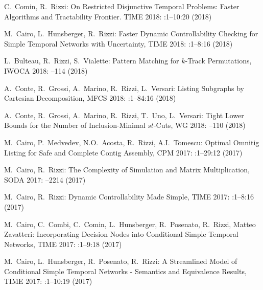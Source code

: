 
\begin{etaremune}

  \item {\sc C.~Comin, R.~Rizzi:}
   \newblock On Restricted Disjunctive Temporal Problems: Faster Algorithms and Tractability Frontier.
   \newblock TIME 2018:
   :1--10:20 (2018)
  
  \item {\sc M.~Cairo, L.~Hunsberger, R.~Rizzi:}
   \newblock Faster Dynamic Controllability Checking for Simple Temporal Networks with Uncertainty,
   \newblock TIME 2018:
   :1--8:16 (2018)
   
  \item {\sc L.~Bulteau, R.~Rizzi, S.~Vialette:}
   \newblock Pattern Matching for $k$-Track Permutations,
   \newblock IWOCA 2018:
   --114 (2018)

  \item {\sc A.~Conte, R.~Grossi, A.~Marino, R.~Rizzi, L.~Versari:}
   \newblock Listing Subgraphs by Cartesian Decomposition,
   \newblock MFCS 2018:
   :1--84:16 (2018)

  \item {\sc A.~Conte, R.~Grossi, A.~Marino, R.~Rizzi, T.~Uno, L.~Versari:}
   \newblock Tight Lower Bounds for the Number of Inclusion-Minimal $st$-Cuts,
   \newblock WG 2018:
   --110 (2018)
   
  \item {\sc M.~Cairo, P.~Medvedev, N.O.~Acosta, R.~Rizzi, A.I.~Tomescu:}
   \newblock Optimal Omnitig Listing for Safe and Complete Contig Assembly,
   \newblock CPM 2017:
   :1--29:12 (2017)

  \item {\sc M.~Cairo, R.~Rizzi:}
   \newblock The Complexity of Simulation and Matrix Multiplication,
   \newblock SODA 2017:
   --2214 (2017)

  \item {\sc M.~Cairo, R.~Rizzi:}
   \newblock Dynamic Controllability Made Simple,
   \newblock TIME 2017:
   :1--8:16 (2017)

  \item {\sc M.~Cairo, C.~Combi, C.~Comin, L.~Hunsberger, R.~Posenato, R.~Rizzi, Matteo Zavatteri:}
   \newblock Incorporating Decision Nodes into Conditional Simple Temporal Networks,
   \newblock TIME 2017:
   :1--9:18 (2017)

  \item {\sc M.~Cairo, L.~Hunsberger, R.~Posenato, R.~Rizzi:}
   \newblock A Streamlined Model of Conditional Simple Temporal Networks - Semantics and Equivalence Results,
   \newblock TIME 2017:
   :1--10:19 (2017)


\end{etaremune}
